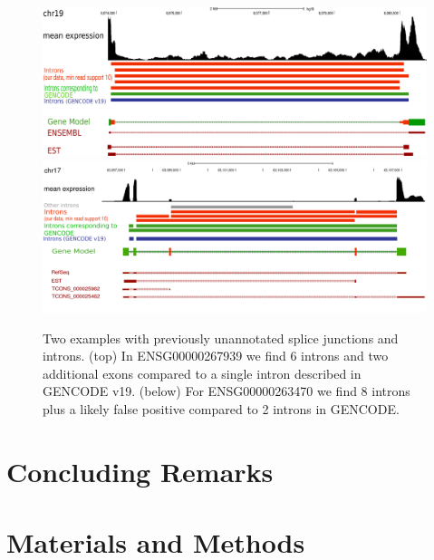 \documentclass[ncrna,article,submit,moreauthors,pdftex,10pt,a4paper]{mdpi}
\begin{document}
\begin{figure}[t]
\begin{center}
\includegraphics[width=\textwidth]{267939.pdf}\\[1em]
\includegraphics[width=\textwidth]{example.pdf}
\end{center}
\caption{Two examples with previously unannotated splice junctions and
  introns.  (top) In ENSG00000267939 we find 6 introns and two additional
  exons compared to a single intron described in GENCODE v19.  (below) For
  ENSG00000263470 we find 8 introns plus a likely false positive compared
  to 2 introns in GENCODE.}
\label{fig:examples} 
\end{figure}

\section{Concluding Remarks} 
	

\section{Materials and Methods}
\end{document}
